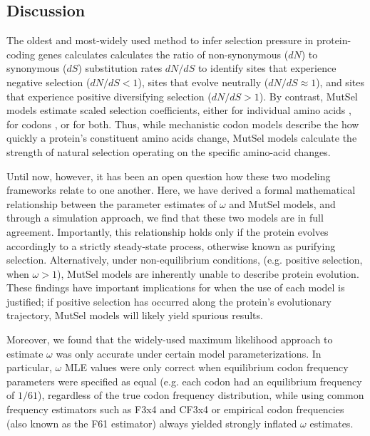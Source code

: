 \documentclass[11pt]{article}
\begin{document}
\subsection*{Discussion}
The oldest and most-widely used method to infer selection pressure in protein-coding genes calculates calculates the ratio of non-synonymous ($dN$) to synonymous ($dS$) substitution rates $dN/dS$ to identify sites that experience negative selection ($dN/dS<1$), sites that evolve neutrally ($dN/dS\approx1$), and sites that experience positive diversifying selection ($dN/dS>1$). By contrast, MutSel models estimate scaled selection coefficients, either for individual amino acids \cite{HalpernBruno1998,Bruno1996,Rodrigueetal2010,Tamurietal2012,Tamurietal2014}, for codons \cite{YangNielsen2008}, or for both. Thus, while mechanistic codon models describe the how quickly a protein's constituent amino acids change, MutSel models calculate the strength of natural selection operating on the specific amino-acid changes.  

Until now, however, it has been an open question how these two modeling frameworks relate to one another. Here, we have derived a formal mathematical relationship between the parameter estimates of $\omega$ and MutSel models, and through a simulation approach, we find that these two models are in full agreement. Importantly, this relationship holds only if the protein evolves accordingly to a strictly steady-state process, otherwise known as purifying selection. Alternatively, under non-equilibrium conditions, (e.g. positive selection, when $\omega > 1$), MutSel models are inherently unable to describe protein evolution. These findings have important implications for when the use of each model is justified; if positive selection has occurred along the protein's evolutionary trajectory, MutSel models will likely yield spurious results. 




Moreover, we found that the widely-used maximum likelihood approach to estimate $\omega$ was only accurate under certain model parameterizations. In particular, $\omega$ MLE values were only correct when equilibrium codon frequency parameters were specified as equal (e.g. each codon had an equilibrium frequency of $1/61$), regardless of the true codon frequency distribution, while using common frequency estimators such as F3x4 \cite{MuseGaut1994} and CF3x4 \cite{Pond2010} or empirical codon frequencies (also known as the F61 estimator) always yielded strongly inflated $\omega$ estimates.
\end{document}
